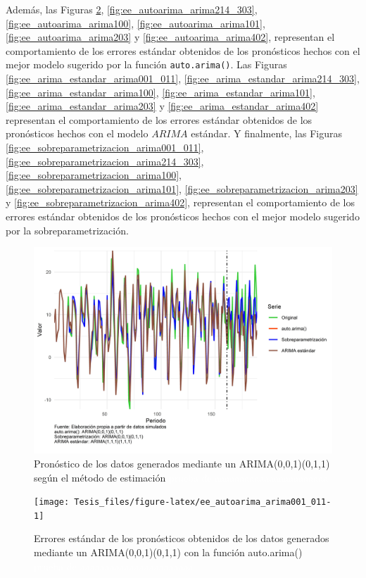 \documentclass[
]{article}
\begin{document}
Además, las Figuras \ref{fig:ee_autoarima_arima001_011},
\ref{fig:ee_autoarima_arima214_303}, \ref{fig:ee_autoarima_arima100},
\ref{fig:ee_autoarima_arima101}, \ref{fig:ee_autoarima_arima203} y
\ref{fig:ee_autoarima_arima402}, representan el comportamiento de los
errores estándar obtenidos de los pronósticos hechos con el mejor modelo
sugerido por la función \texttt{auto.arima()}. Las Figuras
\ref{fig:ee_arima_estandar_arima001_011},
\ref{fig:ee_arima_estandar_arima214_303},
\ref{fig:ee_arima_estandar_arima100},
\ref{fig:ee_arima_estandar_arima101},
\ref{fig:ee_arima_estandar_arima203} y
\ref{fig:ee_arima_estandar_arima402} representan el comportamiento de
los errores estándar obtenidos de los pronósticos hechos con el modelo
\(ARIMA\) estándar. Y finalmente, las Figuras
\ref{fig:ee_sobreparametrizacion_arima001_011},
\ref{fig:ee_sobreparametrizacion_arima214_303},
\ref{fig:ee_sobreparametrizacion_arima100},
\ref{fig:ee_sobreparametrizacion_arima101},
\ref{fig:ee_sobreparametrizacion_arima203} y
\ref{fig:ee_sobreparametrizacion_arima402}, representan el
comportamiento de los errores estándar obtenidos de los pronósticos
hechos con el mejor modelo sugerido por la sobreparametrización.

\begin{figure}[H]
\includegraphics[width=1\linewidth,height=1\textheight]{Tesis_files/figure-latex/pronostico_arima001_011-1} \caption{Pronóstico de los datos generados mediante un ARIMA(0,0,1)(0,1,1) según el método de estimación \textcolor{white}{prueba de aaaaaaaaaaaaaaaaaaaaaaa}}\label{fig:pronostico_arima001_011}
\end{figure}

\begin{figure}[H]
\texttt{[image: Tesis\_files/figure-latex/ee\_autoarima\_arima001\_011-1]} \caption{Errores estándar de los pronósticos obtenidos de los datos generados mediante un ARIMA(0,0,1)(0,1,1) con la función auto.arima() \textcolor{white}{prueba de aaaaaaaaaaaaaaaaaaaaaaa}}\label{fig:ee_autoarima_arima001_011}
\end{figure}
\end{document}
